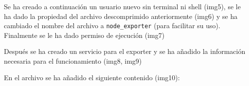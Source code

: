 Se ha creado a continuación un usuario nuevo sin terminal ni shell
(img5), se le ha dado la propiedad del archivo descomprimido
anteriormente (img6) y se ha cambiado el nombre del archivo a
\texttt{node\_exporter} (para facilitar su uso). Finalmente se le ha
dado permiso de ejecución (img7)

\begin{Shaded}
\begin{Highlighting}[]
  
 
\end{Highlighting}
\end{Shaded}

Después se ha creado un servicio para el exporter y se ha añadido la
información necesaria para el funcionamiento (img8, img9)

\begin{Shaded}
\begin{Highlighting}[]
\end{Highlighting}
\end{Shaded}

En el archivo se ha añadido el siguiente contenido (img10):

\begin{Shaded}
\begin{Highlighting}[]
\ExtensionTok{[Unit]}
\OperatorTok{=}
\OperatorTok{=}
\OperatorTok{=}

\ExtensionTok{[Service]}
\OperatorTok{=}
\OperatorTok{=}
\OperatorTok{=}
\OperatorTok{=}

\ExtensionTok{[Install]}
\OperatorTok{=}
\end{Highlighting}
\end{Shaded}

